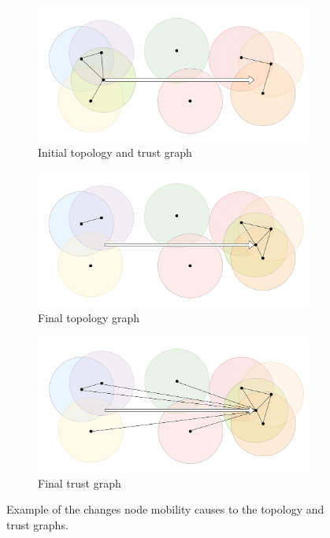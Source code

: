 \begin{figure}
\centering

\begin{subfigure}{0.5\textwidth}
\includegraphics[width=\linewidth]{images/manet_topology_1.png}
\caption{Initial topology and trust graph} \label{fig:2_2a}
\end{subfigure}

\vspace*{\fill} %

\begin{subfigure}{0.5\textwidth}
\includegraphics[width=\linewidth]{images/manet_topology_2.png}
\caption{Final topology graph} \label{fig:2_2b}
\end{subfigure}

\vspace*{\fill} %

\begin{subfigure}{0.5\textwidth}
\includegraphics[width=\linewidth]{images/manet_trust.png}
\caption{Final trust graph} \label{fig:2_3b}
\end{subfigure}

\caption{Example of the changes node mobility causes to the topology and trust graphs.} \label{fig:manet}
\end{figure}

